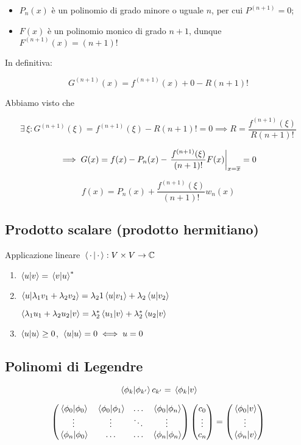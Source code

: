 \begin{itemize}
   \item $P_n(x)$ è un polinomio di grado minore o uguale $n$, per cui $P^{(n+1)}=0$;
   \item $F(x)$ è un polinomio monico di grado $n+1$, dunque $F^{(n+1)}(x)=(n+1)!$
\end{itemize}

In definitiva:

$$G^{(n+1)}(x)=f^{(n+1)}(x) + 0 - R(n+1)!$$

Abbiamo visto che

$$\exists \, \xi : G^{(n+1)}(\xi)=f^{(n+1)}(\xi) - R(n+1)!=0
\implies
R=\frac{f^{(n+1)}(\xi)}{R(n+1)!}$$

$$\implies G(x)=f(x) - P_n(x) - \eval{\frac{f^{(n+1)}(\xi)}{(n+1)!} F(x)}_{x=\overline{x}}=0$$

$$f(x)=P_n(x) + \frac{f^{(n+1)}(\xi)}{(n+1)!} w_n(x)$$

\subsection{Prodotto scalare (prodotto hermitiano)}

Applicazione lineare $\braket*{\, \cdot \, }{\, \cdot \,}:V \times V \to \mathbb{C}$

\begin{enumerate}[label=(\roman*)]
   \item $\braket*{u}{v}=\braket*{v}{u}^*$
   \item $\braket*{u}{\lambda_1 v_1 + \lambda_2 v_2}=\lambda_21\braket*{u}{v_1} + \lambda_2 \braket*{u}{v_2}$
   
   $\braket*{\lambda_1 u_1 + \lambda_2 u_2}{v}=\lambda^*_2 \braket*{u_1}{v} + \lambda^*_2 \braket*{u_2}{v}$
   \item $\braket*{u}{u} \geq 0$, $\braket*{u}{u}=0 \iff u=0$
\end{enumerate}

\subsection{Polinomi di Legendre}

$$\braket*{\phi_k}{\phi_{k'}}c_{k'}
=\braket*{\phi_k}{v}$$

$$\begin{pmatrix}
   \braket*{\phi_0}{\phi_0} & \braket*{\phi_0}{\phi_1} & \ldots & \braket*{\phi_0}{\phi_n}\\
   \vdots &\vdots & \ddots & \vdots\\
   \braket*{\phi_n}{\phi_0} & \ldots & \ldots & \braket*{\phi_n}{\phi_n}
\end{pmatrix}
\begin{pmatrix}
   c_0\\
   \vdots\\
   c_n
\end{pmatrix}
=
\begin{pmatrix}
   \braket*{\phi_0}{v}\\
   \vdots\\
   \braket*{\phi_n}{v}
\end{pmatrix}$$

